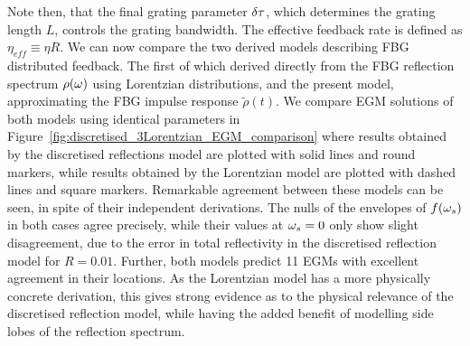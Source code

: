 %
\par
%
Note then, that the final grating parameter $\delta \tau$, which determines the grating length $L$, controls the grating bandwidth. 
The effective feedback rate is defined as $\eta_{eff} \equiv \eta R$. We can now compare the two derived models describing FBG distributed feedback. 
The first of which derived directly from the FBG reflection spectrum $\rho(\omega)$ using Lorentzian distributions, and the present model, approximating the FBG impulse response $\tilde{\rho}(t)$. 
We compare EGM solutions of both models using identical parameters in Figure~\ref{fig:discretised_3Lorentzian_EGM_comparison} where results obtained by the discretised reflections model are plotted with solid lines and round markers, 
while results obtained by the Lorentzian model are plotted with dashed lines and square markers. 
Remarkable agreement between these models can be seen, in spite of their independent derivations. 
The nulls of the envelopes of $f(\omega_s)$ in both cases agree precisely, while their values at $\omega_s=0$ only show slight disagreement, due to the error in total reflectivity in the discretised reflection model for $R=0.01$. 
Further, both models predict 11 EGMs with excellent agreement in their locations. 
As the Lorentzian model has a more physically concrete derivation, this gives strong evidence as to the physical relevance of the discretised reflection model, while having the added benefit of modelling side lobes of the reflection spectrum. 